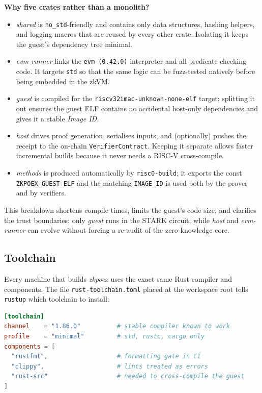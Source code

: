 \textbf{Why five crates rather than a monolith?}
\begin{itemize}
  \item \textit{shared} is \texttt{no\_std}-friendly and contains only data
        structures, hashing helpers, and logging macros that are reused by every
        other crate.  Isolating it keeps the guest’s dependency tree minimal.
  \item \textit{evm-runner} links the \texttt{evm\,(0.42.0)} interpreter and all
        predicate checking code.  It targets \texttt{std} so that the same
        logic can be fuzz-tested natively before being embedded in the zkVM.
  \item \textit{guest} is compiled for the \texttt{riscv32imac-unknown-none-elf}
        target; splitting it out ensures the guest ELF contains no accidental
        host-only dependencies and gives it a stable \textit{Image ID}.
  \item \textit{host} drives proof generation, serialises inputs, and (optionally)
        pushes the receipt to the on-chain \texttt{VerifierContract}. Keeping
        it separate allows faster incremental builds because it never needs a
        RISC-V cross-compile.
  \item \textit{methods} is produced automatically by \texttt{risc0-build}; it exports the const \texttt{ZKPOEX\_GUEST\_ELF} and the matching \texttt{IMAGE\_ID} is used both by the prover and by verifiers.
\end{itemize}

This breakdown shortens compile times, limits the guest’s code size, and
clarifies the trust boundaries: only \textit{guest} runs in the STARK circuit,
while \textit{host} and \textit{evm-runner} can evolve without forcing a re-audit
of the zero-knowledge core.

\subsection{Toolchain}  

Every machine that builds \textit{zkpoex} uses the exact same Rust compiler and
components.  The file \texttt{rust-toolchain.toml} placed at the workspace
root tells \texttt{rustup} which toolchain to install:

\begin{lstlisting}[caption={[Pinned toolchain]},language=toml]
[toolchain]
channel    = "1.86.0"          # stable compiler known to work
profile    = "minimal"         # std, rustc, cargo only
components = [
  "rustfmt",                   # formatting gate in CI
  "clippy",                    # lints treated as errors
  "rust-src"                   # needed to cross-compile the guest
]
\end{lstlisting}


